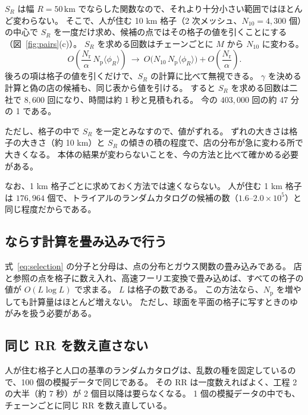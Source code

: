 \documentclass[a4paper,11pt]{ltjsarticle}
\begin{document}
$S_R$ は幅 $R = 50\,\mathrm{km}$ でならした関数なので、それより十分小さい範囲ではほとんど変わらない。
そこで、人が住む 10 km 格子（2 次メッシュ、$N_{10} = 4{,}300$ 個）の中心で $S_R$ を一度だけ求め、候補の点ではその格子の値を引くことにする（図~\ref{fig:pairs}(c)）。
$S_R$ を求める回数はチェーンごとに $M$ から $N_{10}$ に変わる。
\begin{equation}
  O\!\left(\frac{N_{\mathrm{r}}}{\alpha}\, N_{\mathrm{p}} \langle\phi_R\rangle\right)
  \ \longrightarrow\
  O\bigl(N_{10}\, N_{\mathrm{p}} \langle\phi_R\rangle\bigr) + O\!\left(\frac{N_{\mathrm{r}}}{\alpha}\right).
\end{equation}
後ろの項は格子の値を引くだけで、$S_R$ の計算に比べて無視できる。
$\gamma$ を決める計算と偽の店の候補も、同じ表から値を引ける。
すると $S_R$ を求める回数は二社で $8{,}600$ 回になり、時間は約 1 秒と見積もれる。
今の $403{,}000$ 回の約 47 分の 1 である。

ただし、格子の中で $S_R$ を一定とみなすので、値がずれる。
ずれの大きさは格子の大きさ（約 10 km）と $S_R$ の傾きの積の程度で、店の分布が急に変わる所で大きくなる。
本体の結果が変わらないことを、今の方法と比べて確かめる必要がある。

なお、1 km 格子ごとに求めておく方法では速くならない。
人が住む 1 km 格子は $176{,}964$ 個で、トライアルのランダムカタログの候補の数（$1.6$--$2.0 \times 10^5$）と同じ程度だからである。

\subsection{ならす計算を畳み込みで行う}

式~\eqref{eq:selection} の分子と分母は、点の分布とガウス関数の畳み込みである。
店と参照の点を格子に数え入れ、高速フーリエ変換で畳み込めば、すべての格子の値が $O(L \log L)$ で求まる。
$L$ は格子の数である。
この方法なら、$N_{\mathrm{p}}$ を増やしても計算量はほとんど増えない。
ただし、球面を平面の格子に写すときのゆがみを扱う必要がある。

\subsection{同じ RR を数え直さない}

人が住む格子と人口の基準のランダムカタログは、乱数の種を固定しているので、100 個の模擬データで同じである。
その RR は一度数えればよく、工程 2 の大半（約 7 秒）が 2 個目以降は要らなくなる。
1 個の模擬データの中でも、チェーンごとに同じ RR を数え直している。
\end{document}

